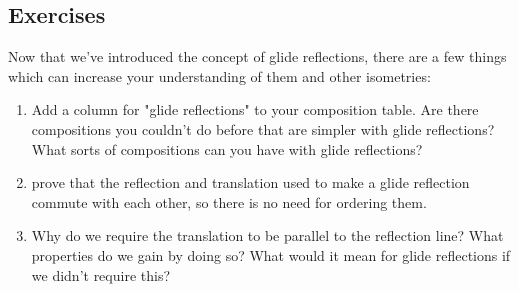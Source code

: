 \documentclass[11pt]{article}
\theoremstyle{definition}
\begin{document}
\subsection{Exercises}

Now that we've introduced the concept of glide reflections, there are a few
things which can increase your understanding of them and other isometries:
\begin{enumerate}
\item Add a column for "glide reflections" to your composition table. Are there
  compositions you couldn't do before that are simpler with glide reflections?
  What sorts of compositions can you have with glide reflections?
\item prove that the reflection and translation used to make a glide reflection
  commute with each other, so there is no need for ordering them.
\item Why do we require the translation to be parallel to the reflection line?
  What properties do we gain by doing so? What would it mean for glide
  reflections if we didn't require this?
\end{enumerate}
\end{document}
